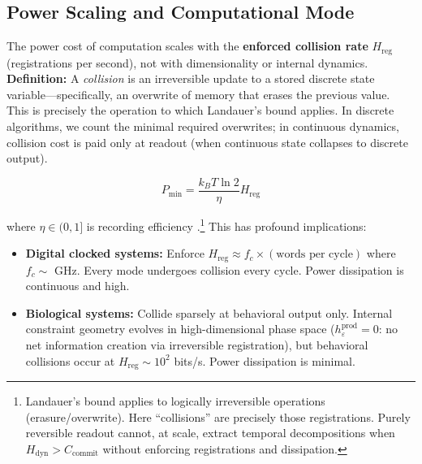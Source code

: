 \documentclass[12pt]{article}
\begin{document}
\subsection{Power Scaling and Computational Mode}

The power cost of computation scales with the \textbf{enforced collision rate} $H_{\text{reg}}$ (registrations per second), not with dimensionality or internal dynamics. \textbf{Definition:} A \textit{collision} is an irreversible update to a stored discrete state variable---specifically, an overwrite of memory that erases the previous value. This is precisely the operation to which Landauer's bound applies. In discrete algorithms, we count the minimal required overwrites; in continuous dynamics, collision cost is paid only at readout (when continuous state collapses to discrete output).

\begin{equation}
P_{\text{min}} = \frac{k_B T \ln 2}{\eta} H_{\text{reg}}
\end{equation}

where $\eta \in (0,1]$ is recording efficiency \cite{landauer1961}.\footnote{Landauer's bound applies to logically irreversible operations (erasure/overwrite). Here ``collisions'' are precisely those registrations. Purely reversible readout cannot, at scale, extract temporal decompositions when $H_{\text{dyn}}>C_{\text{commit}}$ without enforcing registrations and dissipation.} This has profound implications:

\begin{itemize}
\item \textbf{Digital clocked systems:} Enforce $H_{\text{reg}} \approx f_c \times (\text{words per cycle})$ where $f_c \sim$ GHz. Every mode undergoes collision every cycle. Power dissipation is continuous and high.

\item \textbf{Biological systems:} Collide sparsely at behavioral output only. Internal constraint geometry evolves in high-dimensional phase space ($h_\varepsilon^{\text{prod}} = 0$: no net information creation via irreversible registration), but behavioral collisions occur at $H_{\text{reg}} \sim 10^2$ bits/s. Power dissipation is minimal.
\end{itemize}
\end{document}
